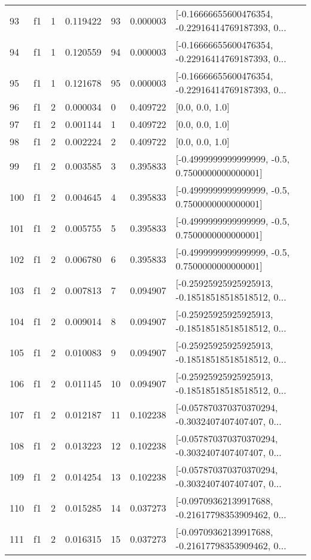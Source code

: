 \begin{tabular}{lllrlrl}
93  &  f1 &   1 &  0.119422 &   93 &  0.000003 &  [-0.16666655600476354, -0.22916414769187393, 0... \\
94  &  f1 &   1 &  0.120559 &   94 &  0.000003 &  [-0.16666655600476354, -0.22916414769187393, 0... \\
95  &  f1 &   1 &  0.121678 &   95 &  0.000003 &  [-0.16666655600476354, -0.22916414769187393, 0... \\
96  &  f1 &   2 &  0.000034 &    0 &  0.409722 &                                    [0.0, 0.0, 1.0] \\
97  &  f1 &   2 &  0.001144 &    1 &  0.409722 &                                    [0.0, 0.0, 1.0] \\
98  &  f1 &   2 &  0.002224 &    2 &  0.409722 &                                    [0.0, 0.0, 1.0] \\
99  &  f1 &   2 &  0.003585 &    3 &  0.395833 &    [-0.4999999999999999, -0.5, 0.7500000000000001] \\
100 &  f1 &   2 &  0.004645 &    4 &  0.395833 &    [-0.4999999999999999, -0.5, 0.7500000000000001] \\
101 &  f1 &   2 &  0.005755 &    5 &  0.395833 &    [-0.4999999999999999, -0.5, 0.7500000000000001] \\
102 &  f1 &   2 &  0.006780 &    6 &  0.395833 &    [-0.4999999999999999, -0.5, 0.7500000000000001] \\
103 &  f1 &   2 &  0.007813 &    7 &  0.094907 &  [-0.25925925925925913, -0.18518518518518512, 0... \\
104 &  f1 &   2 &  0.009014 &    8 &  0.094907 &  [-0.25925925925925913, -0.18518518518518512, 0... \\
105 &  f1 &   2 &  0.010083 &    9 &  0.094907 &  [-0.25925925925925913, -0.18518518518518512, 0... \\
106 &  f1 &   2 &  0.011145 &   10 &  0.094907 &  [-0.25925925925925913, -0.18518518518518512, 0... \\
107 &  f1 &   2 &  0.012187 &   11 &  0.102238 &  [-0.057870370370370294, -0.3032407407407407, 0... \\
108 &  f1 &   2 &  0.013223 &   12 &  0.102238 &  [-0.057870370370370294, -0.3032407407407407, 0... \\
109 &  f1 &   2 &  0.014254 &   13 &  0.102238 &  [-0.057870370370370294, -0.3032407407407407, 0... \\
110 &  f1 &   2 &  0.015285 &   14 &  0.037273 &  [-0.09709362139917688, -0.21617798353909462, 0... \\
111 &  f1 &   2 &  0.016315 &   15 &  0.037273 &  [-0.09709362139917688, -0.21617798353909462, 0... \\

\end{tabular}
